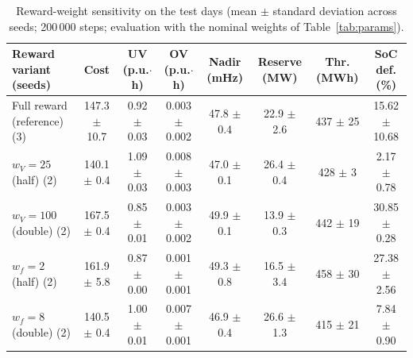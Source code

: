 \begin{table}[!t]
\caption{Reward-weight sensitivity on the test days (mean $\pm$ standard deviation across seeds; 200\,000 steps; evaluation with the nominal weights of Table~\ref{tab:params}).}
\label{tab:sensitivity}
\centering
\footnotesize
\setlength{\tabcolsep}{4pt}
\begin{tabular}{lccccccc}
\toprule
\textbf{Reward variant (seeds)} & \textbf{Cost} & \textbf{UV (p.u.$\cdot$h)} & \textbf{OV (p.u.$\cdot$h)} & \textbf{Nadir (mHz)} & \textbf{Reserve (MW)} & \textbf{Thr. (MWh)} & \textbf{SoC def. (\%)}\\
\midrule
Full reward (reference) (3) & 147.3 $\pm$ 10.7 & 0.92 $\pm$ 0.03 & 0.003 $\pm$ 0.002 & 47.8 $\pm$ 0.4 & 22.9 $\pm$ 2.6 & 437 $\pm$ 25 & 15.62 $\pm$ 10.68 \\
$w_V=25$ (half) (2) & 140.1 $\pm$ 0.4 & 1.09 $\pm$ 0.03 & 0.008 $\pm$ 0.003 & 47.0 $\pm$ 0.1 & 26.4 $\pm$ 0.4 & 428 $\pm$ 3 & 2.17 $\pm$ 0.78 \\
$w_V=100$ (double) (2) & 167.5 $\pm$ 0.4 & 0.85 $\pm$ 0.01 & 0.003 $\pm$ 0.002 & 49.9 $\pm$ 0.1 & 13.9 $\pm$ 0.3 & 442 $\pm$ 19 & 30.85 $\pm$ 0.28 \\
$w_f=2$ (half) (2) & 161.9 $\pm$ 5.8 & 0.87 $\pm$ 0.00 & 0.001 $\pm$ 0.001 & 49.3 $\pm$ 0.8 & 16.5 $\pm$ 3.4 & 458 $\pm$ 30 & 27.38 $\pm$ 2.56 \\
$w_f=8$ (double) (2) & 140.5 $\pm$ 0.4 & 1.00 $\pm$ 0.01 & 0.007 $\pm$ 0.001 & 46.9 $\pm$ 0.4 & 26.6 $\pm$ 1.3 & 415 $\pm$ 21 & 7.84 $\pm$ 0.90 \\
\bottomrule
\end{tabular}
\end{table}
